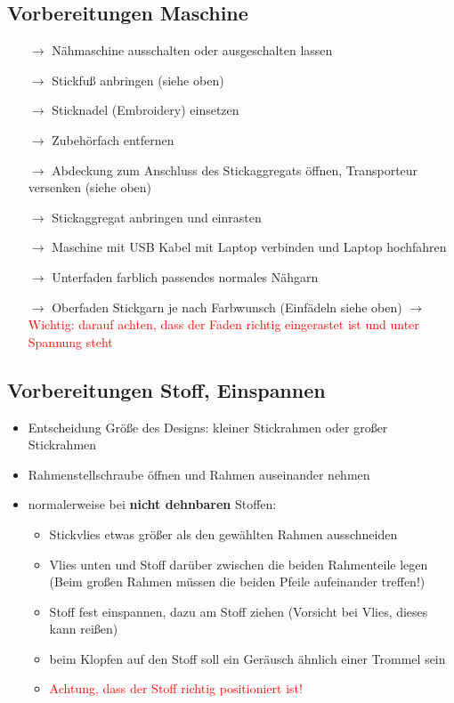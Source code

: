 \documentclass{\basedir/fablab-document}
\newcommand{\pfeil}{\ensuremath{\rightarrow}}
\begin{document}
\subsection{Vorbereitungen Maschine}
\begin{itemize}
 \item[\pfeil] Nähmaschine ausschalten oder ausgeschalten lassen
 \item[\pfeil] Stickfuß anbringen (siehe oben)
 \item[\pfeil] Sticknadel (Embroidery) einsetzen
 \item[\pfeil] Zubehörfach entfernen
 \item[\pfeil] Abdeckung zum Anschluss des Stickaggregats öffnen, Transporteur versenken (siehe oben)
 \item[\pfeil] Stickaggregat anbringen und einrasten
 \item[\pfeil] Maschine mit USB Kabel mit Laptop verbinden und Laptop hochfahren
 \item[\pfeil] Unterfaden farblich passendes normales Nähgarn
 \item[\pfeil] Oberfaden Stickgarn je nach Farbwunsch (Einfädeln siehe oben) \pfeil \textcolor{red}{Wichtig: darauf achten, dass der Faden richtig eingerastet ist und unter Spannung steht}
\end{itemize}

\subsection{Vorbereitungen Stoff, Einspannen}
\begin{itemize}
 \item Entscheidung Größe des Designs: kleiner Stickrahmen oder großer Stickrahmen
 \item Rahmenstellschraube öffnen und Rahmen auseinander nehmen
 \item normalerweise bei \textbf{nicht dehnbaren} Stoffen:
	\begin{itemize}
	 \item Stickvlies etwas größer als den gewählten Rahmen ausschneiden
	 \item Vlies unten und Stoff darüber zwischen die beiden Rahmenteile legen (Beim großen Rahmen müssen die beiden Pfeile aufeinander treffen!)
	 \item Stoff fest einspannen, dazu am Stoff ziehen (Vorsicht bei Vlies, dieses kann reißen)
	 \item beim Klopfen auf den Stoff soll ein Geräusch ähnlich einer Trommel sein
	 \item \textcolor{red}{Achtung, dass der Stoff richtig positioniert ist!} 
	\end{itemize}
\end{itemize} 
\end{document}
